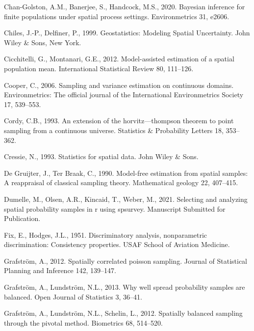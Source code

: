 \documentclass[]{elsarticle} %
\begin{document}
\leavevmode\hypertarget{ref-chan2020bayesian}{}%
Chan-Golston, A.M., Banerjee, S., Handcock, M.S., 2020. Bayesian
inference for finite populations under spatial process settings.
Environmetrics 31, e2606.

\leavevmode\hypertarget{ref-chiles1999geostatistics}{}%
Chiles, J.-P., Delfiner, P., 1999. Geostatistics: Modeling Spatial
Uncertainty. John Wiley \& Sons, New York.

\leavevmode\hypertarget{ref-cicchitelli2012model}{}%
Cicchitelli, G., Montanari, G.E., 2012. Model-assisted estimation of a
spatial population mean. International Statistical Review 80, 111--126.

\leavevmode\hypertarget{ref-cooper2006sampling}{}%
Cooper, C., 2006. Sampling and variance estimation on continuous
domains. Environmetrics: The official journal of the International
Environmetrics Society 17, 539--553.

\leavevmode\hypertarget{ref-cordy1993extension}{}%
Cordy, C.B., 1993. An extension of the horvitz---thompson theorem to
point sampling from a continuous universe. Statistics \& Probability
Letters 18, 353--362.

\leavevmode\hypertarget{ref-cressie1993statistics}{}%
Cressie, N., 1993. Statistics for spatial data. John Wiley \& Sons.

\leavevmode\hypertarget{ref-de1990model}{}%
De Gruijter, J., Ter Braak, C., 1990. Model-free estimation from spatial
samples: A reappraisal of classical sampling theory. Mathematical
geology 22, 407--415.

\leavevmode\hypertarget{ref-dumelle2021spsurvey}{}%
Dumelle, M., Olsen, A.R., Kincaid, T., Weber, M., 2021. Selecting and
analyzing spatial probability samples in r using spsurvey. Manuscript
Submitted for Publication.

\leavevmode\hypertarget{ref-fix1951discriminatory}{}%
Fix, E., Hodges, J.L., 1951. Discriminatory analysis, nonparametric
discrimination: Consistency properties. USAF School of Aviation
Medicine.

\leavevmode\hypertarget{ref-grafstrom2012spatiallypoisson}{}%
Grafström, A., 2012. Spatially correlated poisson sampling. Journal of
Statistical Planning and Inference 142, 139--147.

\leavevmode\hypertarget{ref-grafstrom2013well}{}%
Grafström, A., Lundström, N.L., 2013. Why well spread probability
samples are balanced. Open Journal of Statistics 3, 36--41.

\leavevmode\hypertarget{ref-grafstrom2012spatially}{}%
Grafström, A., Lundström, N.L., Schelin, L., 2012. Spatially balanced
sampling through the pivotal method. Biometrics 68, 514--520.
\end{document}
